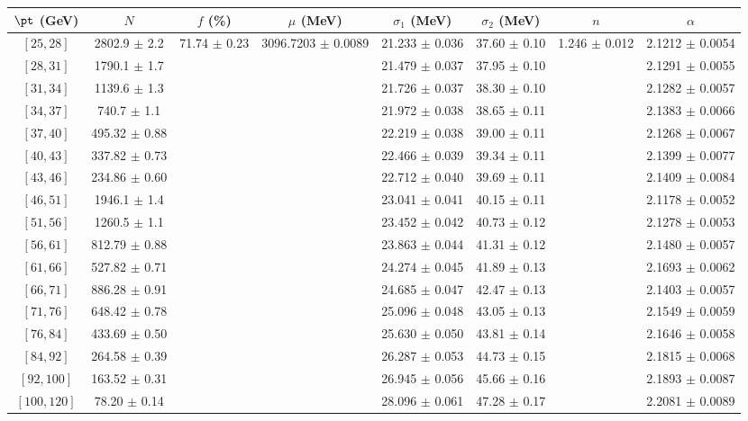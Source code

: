 \begin{tabular}{c||c|c|c|c|c|c|c}
$\pt$ (GeV) & $N$ & $f$ (\%) & $\mu$ (MeV) & $\sigma_1$ (MeV) & $\sigma_2$ (MeV) & $n$ & $\alpha$ \\
\hline
$[25, 28]$ & 2802.9 $\pm$ 2.2 & \multirow{17}{*}{71.74 $\pm$ 0.23} & \multirow{17}{*}{3096.7203 $\pm$ 0.0089} & 21.233 $\pm$ 0.036 & 37.60 $\pm$ 0.10 & \multirow{17}{*}{1.246 $\pm$ 0.012} & 2.1212 $\pm$ 0.0054\\
$[28, 31]$ & 1790.1 $\pm$ 1.7 &  &  & 21.479 $\pm$ 0.037 & 37.95 $\pm$ 0.10 &  & 2.1291 $\pm$ 0.0055\\
$[31, 34]$ & 1139.6 $\pm$ 1.3 &  &  & 21.726 $\pm$ 0.037 & 38.30 $\pm$ 0.10 &  & 2.1282 $\pm$ 0.0057\\
$[34, 37]$ & 740.7 $\pm$ 1.1 &  &  & 21.972 $\pm$ 0.038 & 38.65 $\pm$ 0.11 &  & 2.1383 $\pm$ 0.0066\\
$[37, 40]$ & 495.32 $\pm$ 0.88 &  &  & 22.219 $\pm$ 0.038 & 39.00 $\pm$ 0.11 &  & 2.1268 $\pm$ 0.0067\\
$[40, 43]$ & 337.82 $\pm$ 0.73 &  &  & 22.466 $\pm$ 0.039 & 39.34 $\pm$ 0.11 &  & 2.1399 $\pm$ 0.0077\\
$[43, 46]$ & 234.86 $\pm$ 0.60 &  &  & 22.712 $\pm$ 0.040 & 39.69 $\pm$ 0.11 &  & 2.1409 $\pm$ 0.0084\\
$[46, 51]$ & 1946.1 $\pm$ 1.4 &  &  & 23.041 $\pm$ 0.041 & 40.15 $\pm$ 0.11 &  & 2.1178 $\pm$ 0.0052\\
$[51, 56]$ & 1260.5 $\pm$ 1.1 &  &  & 23.452 $\pm$ 0.042 & 40.73 $\pm$ 0.12 &  & 2.1278 $\pm$ 0.0053\\
$[56, 61]$ & 812.79 $\pm$ 0.88 &  &  & 23.863 $\pm$ 0.044 & 41.31 $\pm$ 0.12 &  & 2.1480 $\pm$ 0.0057\\
$[61, 66]$ & 527.82 $\pm$ 0.71 &  &  & 24.274 $\pm$ 0.045 & 41.89 $\pm$ 0.13 &  & 2.1693 $\pm$ 0.0062\\
$[66, 71]$ & 886.28 $\pm$ 0.91 &  &  & 24.685 $\pm$ 0.047 & 42.47 $\pm$ 0.13 &  & 2.1403 $\pm$ 0.0057\\
$[71, 76]$ & 648.42 $\pm$ 0.78 &  &  & 25.096 $\pm$ 0.048 & 43.05 $\pm$ 0.13 &  & 2.1549 $\pm$ 0.0059\\
$[76, 84]$ & 433.69 $\pm$ 0.50 &  &  & 25.630 $\pm$ 0.050 & 43.81 $\pm$ 0.14 &  & 2.1646 $\pm$ 0.0058\\
$[84, 92]$ & 264.58 $\pm$ 0.39 &  &  & 26.287 $\pm$ 0.053 & 44.73 $\pm$ 0.15 &  & 2.1815 $\pm$ 0.0068\\
$[92, 100]$ & 163.52 $\pm$ 0.31 &  &  & 26.945 $\pm$ 0.056 & 45.66 $\pm$ 0.16 &  & 2.1893 $\pm$ 0.0087\\
$[100, 120]$ & 78.20 $\pm$ 0.14 &  &  & 28.096 $\pm$ 0.061 & 47.28 $\pm$ 0.17 &  & 2.2081 $\pm$ 0.0089\\
\end{tabular}
